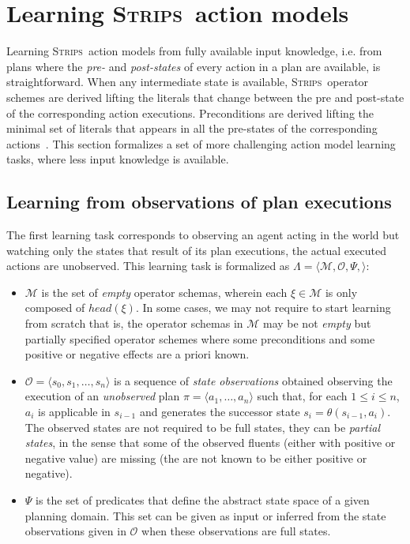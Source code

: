 \documentclass[3p,times]{elsarticle}
\newcommand{\strips}{\textsc{Strips}}     %
\newcommand{\tup}[1]{{\langle #1 \rangle}}
\begin{document}
\section{Learning \strips\ action models}
\label{sec:Section4}
Learning \strips\ action models from fully available input knowledge, i.e. from plans where the {\em pre-} and {\em post-states} of every action in a plan are available, is straightforward. When any intermediate state is available, \strips\ operator schemes are derived lifting the literals that change between the pre and post-state of the corresponding action executions. Preconditions are derived lifting the minimal set of literals that appears in all the pre-states of the corresponding actions~\cite{jimenez2012review}. This section formalizes a set of more challenging action model learning tasks, where less input knowledge is available.

\subsection{Learning from observations of plan executions}

The first learning task corresponds to observing an agent acting in the world but watching only the states that result of its plan executions, the actual executed actions are unobserved. This learning task is formalized as $\Lambda=\tup{\mathcal{M},\mathcal{O},\Psi,}$:
\begin{itemize}
\item $\mathcal{M}$ is the set of {\em empty} operator schemas, wherein each $\xi\in\mathcal{M}$ is only composed of $head(\xi)$. In some cases, we may not require to start learning from scratch that is, the operator schemas in $\mathcal{M}$ may be not {\em empty} but partially specified operator schemes where some preconditions and some positive or negative effects are a priori known.
\item $\mathcal{O}=\tup{s_0,s_1,\ldots,s_{n}}$ is a sequence of {\em state observations} obtained observing the execution of an {\em unobserved} plan $\pi=\tup{a_1, \ldots, a_n}$ such that, for each {\small $1\leq i\leq n$}, $a_i$ is applicable in $s_{i-1}$ and generates the successor state $s_i=\theta(s_{i-1},a_i)$. The observed states are not required to be full states, they can be {\em partial states}, in the sense that some of the observed fluents (either with positive or negative value) are missing (the are not known to be either positive or negative).
\item $\Psi$ is the set of predicates that define the abstract state space of a given planning domain. This set can be given as input or inferred from the state observations given in $\mathcal{O}$ when these observations are full states.
\end{itemize}
\end{document}
